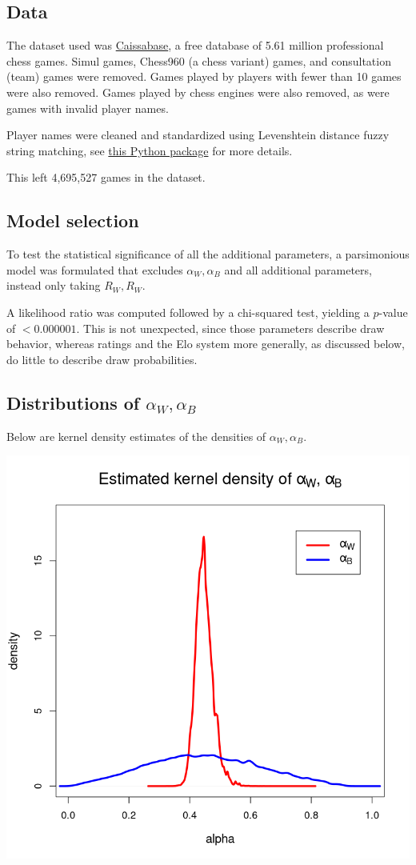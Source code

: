 \documentclass{article}
\begin{document}
\subsection{Data}
The dataset used was \href{http://caissabase.co.uk/}{Caissabase}, a free database of 5.61 million professional chess games.
Simul games, Chess960 (a chess variant) games, and consultation (team) games were removed.
Games played by players with fewer than 10 games were also removed.
Games played by chess engines were also removed, as were games with invalid player names.

Player names were cleaned and standardized using Levenshtein distance fuzzy string matching,
see \href{https://github.com/seatgeek/thefuzz}{this Python package} for more details.

This left 4,695,527 games in the dataset.

\subsection{Model selection}
To test the statistical significance of all the additional parameters, a parsimonious model
was formulated that excludes $\alpha_W,\alpha_B$ and all additional parameters, instead only
taking $R_W,R_W$.

A likelihood ratio was computed followed by a chi-squared test, yielding a $p$-value of $<0.000001$.
This is not unexpected, since those parameters describe draw behavior, whereas ratings and the Elo system more generally, as discussed
below, do little to describe draw probabilities.

\subsection{Distributions of $\alpha_W, \alpha_B$}

Below are kernel density estimates of the densities of $\alpha_W,\alpha_B$.

\includegraphics[width=\textwidth]{./distributions.png}
\end{document}
